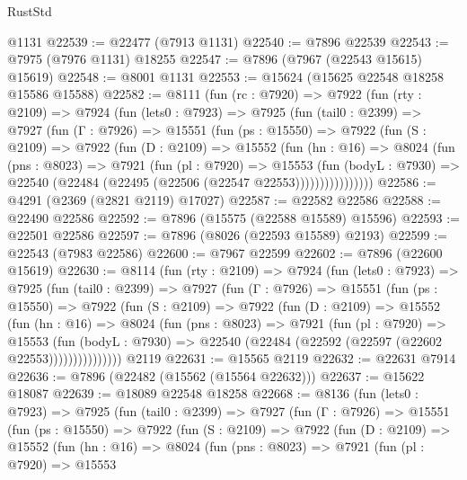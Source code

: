 \begin{lexlean}{RustStd}
\begin{coremodule}
    @1131
@22539 := @22477 (@7913 @1131)
@22540 := @7896 @22539
@22543 := @7975 (@7976 @1131) @18255
@22547 := @7896 (@7967 (@22543 @15615) @15619)
@22548 := @8001 @1131
@22553 := @15624 (@15625 @22548 @18258 @15586 @15588)
@22582 := @8111
    (fun (rc : @7920) =>
    @7922
      (fun (rty : @2109) =>
      @7924
        (fun (lets0 : @7923) =>
        @7925
          (fun (tail0 : @2399) =>
          @7927
            (fun (Γ : @7926) =>
            @15551
              (fun (ps : @15550) =>
              @7922
                (fun (S : @2109) =>
                @7922
                  (fun (D : @2109) =>
                  @15552
                    (fun (hn : @16) =>
                    @8024
                      (fun (pns : @8023) =>
                      @7921
                        (fun (pl : @7920) =>
                        @15553
                          (fun (bodyL : @7930) =>
                          @22540 (@22484 (@22495 (@22506 (@22547 @22553))))))))))))))))
@22586 := @4291 (@2369 (@2821 @2119) @17027)
@22587 := @22582 @22586
@22588 := @22490 @22586
@22592 := @7896 (@15575 (@22588 @15589) @15596)
@22593 := @22501 @22586
@22597 := @7896 (@8026 (@22593 @15589) @2193)
@22599 := @22543 (@7983 @22586)
@22600 := @7967 @22599
@22602 := @7896 (@22600 @15619)
@22630 := @8114
    (fun (rty : @2109) =>
    @7924
      (fun (lets0 : @7923) =>
      @7925
        (fun (tail0 : @2399) =>
        @7927
          (fun (Γ : @7926) =>
          @15551
            (fun (ps : @15550) =>
            @7922
              (fun (S : @2109) =>
              @7922
                (fun (D : @2109) =>
                @15552
                  (fun (hn : @16) =>
                  @8024
                    (fun (pns : @8023) =>
                    @7921
                      (fun (pl : @7920) =>
                      @15553
                        (fun (bodyL : @7930) =>
                        @22540 (@22484 (@22592 (@22597 (@22602 @22553)))))))))))))))
    @2119
@22631 := @15565 @2119
@22632 := @22631 @7914
@22636 := @7896 (@22482 (@15562 (@15564 @22632)))
@22637 := @15622 @18087
@22639 := @18089 @22548 @18258
@22668 := @8136
    (fun (lets0 : @7923) =>
    @7925
      (fun (tail0 : @2399) =>
      @7927
        (fun (Γ : @7926) =>
        @15551
          (fun (ps : @15550) =>
          @7922
            (fun (S : @2109) =>
            @7922
              (fun (D : @2109) =>
              @15552
                (fun (hn : @16) =>
                @8024
                  (fun (pns : @8023) =>
                  @7921
                    (fun (pl : @7920) =>
                    @15553

\end{coremodule}
\end{lexlean}
